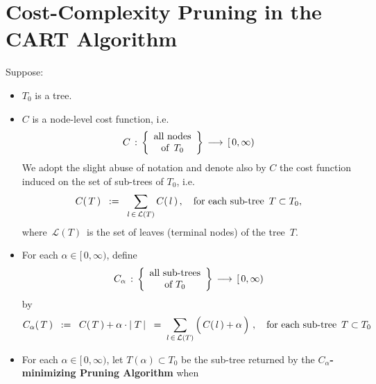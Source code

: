 
\section{Cost-Complexity Pruning in the CART Algorithm}
\setcounter{theorem}{0}


\begin{proposition}
\mbox{}
\vskip 0.1cm
\noindent
Suppose:
\begin{itemize}
\item
	$T_{0}$ is a tree.
\item
	$C$ is a node-level cost function, i.e.
	\begin{equation*}
	C \,:\,
	\left\{\begin{array}{c}
		\textnormal{all nodes}
		\\
		\textnormal{of \,$T_{0}$}
		\end{array}\right\}
	\,\longrightarrow\,
	[\,0,\infty)
	\end{equation*}
	We adopt the slight abuse of notation and denote also by $C$
	the cost function induced on the set of sub-trees of $T_{0}$, i.e.
	\begin{equation*}
	C(\,T\,)
	\;\; := \;\;
		\underset{l \,\in\, \mathcal{L}(T)}{\sum}\, C(\,l\,)\,,
	\quad
	\textnormal{for each sub-tree \,$T \subset T_{0}$},
	\end{equation*}
	where \,$\mathcal{L}(T)$\, is the set of leaves (terminal nodes) of the tree \,$T$.
\item
	For each $\alpha \in [\,0,\infty)$, define 
	\begin{equation*}
	C_{\alpha} \,:\, \left\{\begin{array}{c} \textnormal{all sub-trees} \\ \textnormal{of $T_{0}$} \end{array}\right\}
	\,\longrightarrow\,
	[\,0,\infty)
	\end{equation*}
	by
	\begin{equation*}
	C_{\alpha}(\,T\,)
	\;\; := \;\;
		C(\,T\,) + \alpha \cdot \vert\;T\,\vert
	\;\; = \;
		\underset{l \,\in\, \mathcal{L}(T)}{\sum}\left(\,C(\,l\,) \overset{{\color{white}.}}{+} \alpha\,\right)\,,
	\quad
	\textnormal{for each sub-tree \,$T \subset T_{0}$}
	\end{equation*}
\item
	For each $\alpha \in [\,0,\infty)$, let $T(\alpha) \subset T_{0}$ be the sub-tree
	returned by the \textbf{$C_{\alpha}$-minimizing Pruning Algorithm} when

\end{itemize}
\end{proposition}
